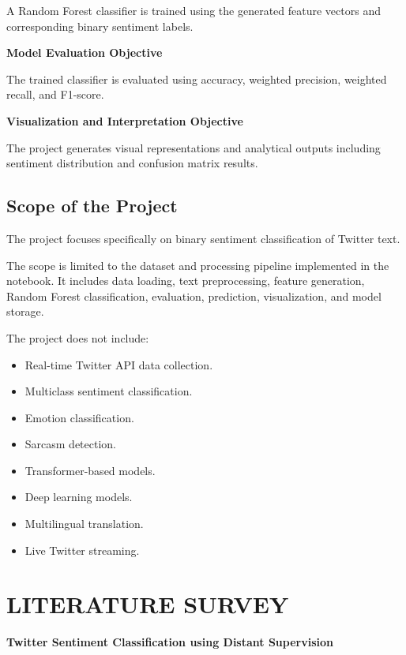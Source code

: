 \documentclass[12pt,a4paper]{article}
\begin{document}
A Random Forest classifier is trained using the generated feature vectors and corresponding binary sentiment labels.

\textbf{Model Evaluation Objective}

The trained classifier is evaluated using accuracy, weighted precision, weighted recall, and F1-score.

\textbf{Visualization and Interpretation Objective}

The project generates visual representations and analytical outputs including sentiment distribution and confusion matrix results.

\subsection{Scope of the Project}

The project focuses specifically on binary sentiment classification of Twitter text.

The scope is limited to the dataset and processing pipeline implemented in the notebook. It includes data loading, text preprocessing, feature generation, Random Forest classification, evaluation, prediction, visualization, and model storage.

The project does not include:

\begin{itemize}
    \item Real-time Twitter API data collection.
    \item Multiclass sentiment classification.
    \item Emotion classification.
    \item Sarcasm detection.
    \item Transformer-based models.
    \item Deep learning models.
    \item Multilingual translation.
    \item Live Twitter streaming.
\end{itemize}

\newpage
\section{LITERATURE SURVEY}

\textbf{Twitter Sentiment Classification using Distant Supervision}\\
\end{document}
